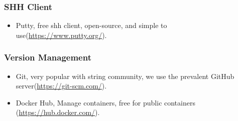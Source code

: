 \subsubsection{SHH Client}
\begin{itemize}
	
	\item  Putty, free shh client, open-source, and simple to use(\url{https://www.putty.org/}).
\end{itemize}

\subsubsection{Version Management}
\begin{itemize}
\item  Git, very popular with string community, we use the prevalent GitHub server(\url{https://git-scm.com/}). 
\item  Docker Hub, Manage containers, free for public containers (\url{https://hub.docker.com/}). 
\end{itemize}
